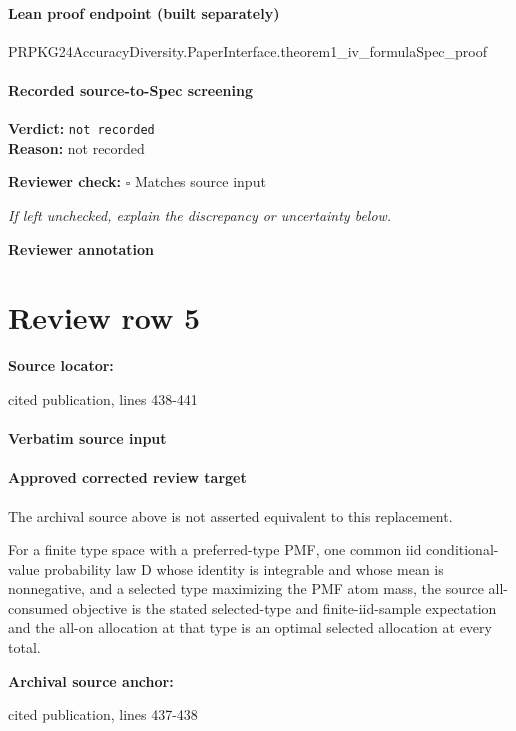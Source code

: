\documentclass[10pt]{article}
\newcommand{\reviewerbox}{%
  \par\noindent\fbox{\parbox{0.96\linewidth}{\rule{0pt}{0.38in}}}\par
}
\newcommand{\reviewmatch}[1]{%
  \par\noindent\textbf{Reviewer check:} $\square$\; #1\par
  \noindent\emph{If left unchecked, explain the discrepancy or uncertainty below.}\par
}
\begin{document}
\paragraph{Lean proof endpoint (built separately)}\begin{ReviewVerbatim}
PRPKG24AccuracyDiversity.PaperInterface.theorem1_iv_formulaSpec_proof
\end{ReviewVerbatim}

\paragraph{Recorded source-to-Spec screening}
\textbf{Verdict:} \texttt{not recorded}
\\
\textbf{Reason:} not recorded
\reviewmatch{Matches source input}
\noindent\textbf{Reviewer annotation}\par
\reviewerbox
\clearpage
\hypertarget{source-claim-846cffa9077c1769}{}
\section*{Review row 5}
\textbf{Source locator:} {\footnotesize\raggedright cited publication, lines 438-\allowbreak{}441\par}
\paragraph{Verbatim source input}
\begin{ReviewVerbatim}
\end{ReviewVerbatim}

\paragraph{Approved corrected review target}
The archival source above is not asserted equivalent to this replacement.
\begin{ReviewVerbatim}
For a finite type space with a preferred-type PMF, one common iid conditional-value probability law D whose identity is integrable and whose mean is nonnegative, and a selected type maximizing the PMF atom mass, the source all-consumed objective is the stated selected-type and finite-iid-sample expectation and the all-on allocation at that type is an optimal selected allocation at every total.
\end{ReviewVerbatim}

\textbf{Archival source anchor:} {\footnotesize\raggedright cited publication, lines 437-\allowbreak{}438\par}
\end{document}
